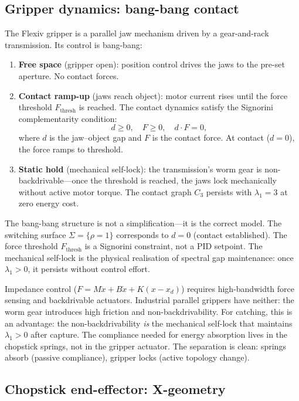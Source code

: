 \subsection{Gripper dynamics: bang-bang contact}

The Flexiv gripper is a parallel jaw mechanism driven by a
gear-and-rack transmission.  Its control is bang-bang:
\begin{enumerate}[nosep]
  \item \textbf{Free space} (gripper open): position control
  drives the jaws to the pre-set aperture.  No contact forces.
  \item \textbf{Contact ramp-up} (jaws reach object): motor
  current rises until the force threshold $F_{\mathrm{thresh}}$
  is reached.  The contact dynamics satisfy the Signorini
  complementarity condition:
  \[
    d \geq 0,\quad F \geq 0,\quad d \cdot F = 0,
  \]
  where $d$ is the jaw--object gap and $F$ is the contact force.
  At contact ($d = 0$), the force ramps to threshold.
  \item \textbf{Static hold} (mechanical self-lock): the
  transmission's worm gear is non-backdrivable---once the
  threshold is reached, the jaws lock mechanically without
  active motor torque.  The contact graph $C_3$ persists
  with $\lambda_1 = 3$ at zero energy cost.
\end{enumerate}
The bang-bang structure is not a simplification---it is the
correct model.  The switching surface $\Sigma = \{\rho = 1\}$
corresponds to $d = 0$ (contact established).  The force
threshold $F_{\mathrm{thresh}}$ is a Signorini constraint,
not a PID setpoint.  The mechanical self-lock is the physical
realisation of spectral gap maintenance: once $\lambda_1 > 0$,
it persists without control effort.

\begin{remark}
Impedance control ($F = M\ddot{x} + B\dot{x} + K(x - x_d)$)
requires high-bandwidth force sensing and backdrivable
actuators.  Industrial parallel grippers have neither: the
worm gear introduces high friction and non-backdrivability.
For catching, this is an advantage: the non-backdrivability
\emph{is} the mechanical self-lock that maintains $\lambda_1 > 0$
after capture.  The compliance needed for energy absorption
lives in the chopstick springs, not in the gripper actuator.
The separation is clean: springs absorb (passive compliance),
gripper locks (active topology change).
\end{remark}

\subsection{Chopstick end-effector: X-geometry}

